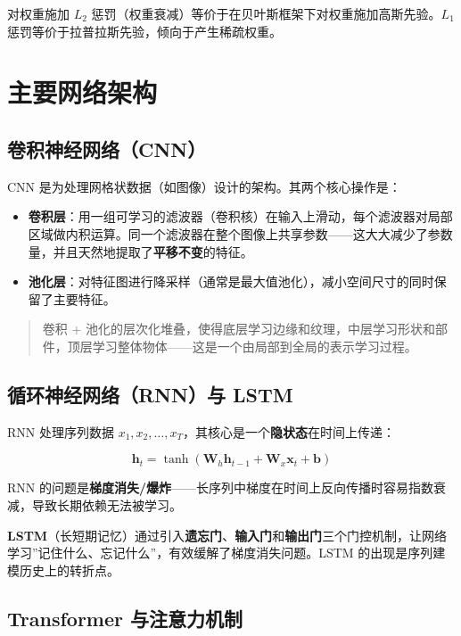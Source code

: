 \documentclass[
]{book}
\providecommand{\tightlist}{%
  \setlength{\itemsep}{0pt}\setlength{\parskip}{0pt}}
\begin{document}
对权重施加 \(L_2\) 惩罚（权重衰减）等价于在贝叶斯框架下对权重施加高斯先验。\(L_1\) 惩罚等价于拉普拉斯先验，倾向于产生稀疏权重。

\section{主要网络架构}\label{ux4e3bux8981ux7f51ux7edcux67b6ux6784}

\subsection{卷积神经网络（CNN）}\label{ux5377ux79efux795eux7ecfux7f51ux7edccnn}

CNN 是为处理网格状数据（如图像）设计的架构。其两个核心操作是：

\begin{itemize}
\tightlist
\item
  \textbf{卷积层}：用一组可学习的滤波器（卷积核）在输入上滑动，每个滤波器对局部区域做内积运算。同一个滤波器在整个图像上共享参数------这大大减少了参数量，并且天然地提取了\textbf{平移不变}的特征。
\item
  \textbf{池化层}：对特征图进行降采样（通常是最大值池化），减小空间尺寸的同时保留了主要特征。
\end{itemize}

\begin{quote}
卷积 + 池化的层次化堆叠，使得底层学习边缘和纹理，中层学习形状和部件，顶层学习整体物体------这是一个由局部到全局的表示学习过程。
\end{quote}

\subsection{循环神经网络（RNN）与 LSTM}\label{ux5faaux73afux795eux7ecfux7f51ux7edcrnnux4e0e-lstm}

RNN 处理序列数据 \(x_1, x_2, \ldots, x_T\)，其核心是一个\textbf{隐状态}在时间上传递：

\[\mathbf{h}_t = \tanh(\mathbf{W}_h \mathbf{h}_{t-1} + \mathbf{W}_x \mathbf{x}_t + \mathbf{b})\]

RNN 的问题是\textbf{梯度消失/爆炸}------长序列中梯度在时间上反向传播时容易指数衰减，导致长期依赖无法被学习。

\textbf{LSTM}（长短期记忆）通过引入\textbf{遗忘门}、\textbf{输入门}和\textbf{输出门}三个门控机制，让网络学习''记住什么、忘记什么''，有效缓解了梯度消失问题。LSTM 的出现是序列建模历史上的转折点。

\subsection{Transformer 与注意力机制}\label{transformer-ux4e0eux6ce8ux610fux529bux673aux5236}
\end{document}
